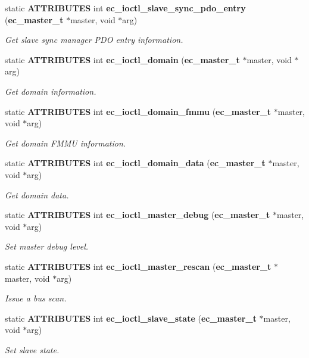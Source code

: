 \begin{DoxyCompactItemize}
static {\bf \-A\-T\-T\-R\-I\-B\-U\-T\-E\-S} int {\bf ec\-\_\-ioctl\-\_\-slave\-\_\-sync\-\_\-pdo\-\_\-entry} ({\bf ec\-\_\-master\-\_\-t} $\ast$master, void $\ast$arg)
\begin{DoxyCompactList}\small\item\em \-Get slave sync manager \-P\-D\-O entry information. \end{DoxyCompactList}\item 
static {\bf \-A\-T\-T\-R\-I\-B\-U\-T\-E\-S} int {\bf ec\-\_\-ioctl\-\_\-domain} ({\bf ec\-\_\-master\-\_\-t} $\ast$master, void $\ast$arg)
\begin{DoxyCompactList}\small\item\em \-Get domain information. \end{DoxyCompactList}\item 
static {\bf \-A\-T\-T\-R\-I\-B\-U\-T\-E\-S} int {\bf ec\-\_\-ioctl\-\_\-domain\-\_\-fmmu} ({\bf ec\-\_\-master\-\_\-t} $\ast$master, void $\ast$arg)
\begin{DoxyCompactList}\small\item\em \-Get domain \-F\-M\-M\-U information. \end{DoxyCompactList}\item 
static {\bf \-A\-T\-T\-R\-I\-B\-U\-T\-E\-S} int {\bf ec\-\_\-ioctl\-\_\-domain\-\_\-data} ({\bf ec\-\_\-master\-\_\-t} $\ast$master, void $\ast$arg)
\begin{DoxyCompactList}\small\item\em \-Get domain data. \end{DoxyCompactList}\item 
static {\bf \-A\-T\-T\-R\-I\-B\-U\-T\-E\-S} int {\bf ec\-\_\-ioctl\-\_\-master\-\_\-debug} ({\bf ec\-\_\-master\-\_\-t} $\ast$master, void $\ast$arg)
\begin{DoxyCompactList}\small\item\em \-Set master debug level. \end{DoxyCompactList}\item 
static {\bf \-A\-T\-T\-R\-I\-B\-U\-T\-E\-S} int {\bf ec\-\_\-ioctl\-\_\-master\-\_\-rescan} ({\bf ec\-\_\-master\-\_\-t} $\ast$master, void $\ast$arg)
\begin{DoxyCompactList}\small\item\em \-Issue a bus scan. \end{DoxyCompactList}\item 
static {\bf \-A\-T\-T\-R\-I\-B\-U\-T\-E\-S} int {\bf ec\-\_\-ioctl\-\_\-slave\-\_\-state} ({\bf ec\-\_\-master\-\_\-t} $\ast$master, void $\ast$arg)
\begin{DoxyCompactList}\small\item\em \-Set slave state. \end{DoxyCompactList}\item 

\end{DoxyCompactItemize}
